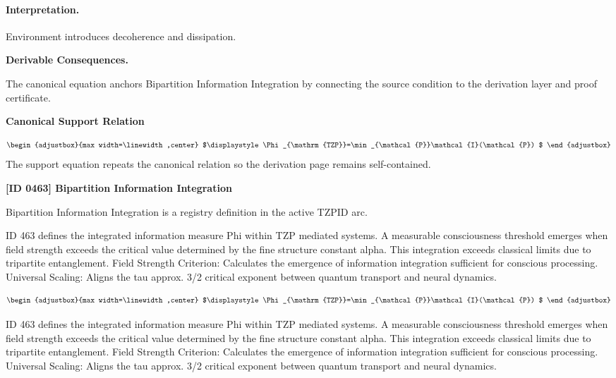 \paragraph{Interpretation.}
Environment introduces decoherence and dissipation.

\par\vspace{0.35em}
\noindent\textbf{Derivable Consequences.}\quad
\begingroup
\footnotesize
\raggedright
The canonical equation anchors Bipartition Information Integration by connecting the source condition to the derivation layer and proof certificate.
\par\endgroup

\noindent\textbf{Canonical Support Relation}\par
\[
\begin{adjustbox}{max width=\linewidth,center}
$\displaystyle
\Phi_{\mathrm{TZP}}=\min_{\mathcal{P}}\mathcal{I}(\mathcal{P})
$
\end{adjustbox}
\]
\noindent The support equation repeats the canonical relation so the derivation page remains self-contained.\par

\clearpage
\noindent\textbf{[ID 0463] Bipartition Information Integration}\par
\vspace{0.35em}
\begingroup\small
{}
Bipartition Information Integration is a registry definition in the active TZPID arc.

ID 463 defines the integrated information measure Phi within TZP mediated systems. A measurable consciousness threshold emerges when field strength exceeds the critical value determined by the fine structure constant alpha. This integration exceeds classical limits due to tripartite entanglement. Field Strength Criterion: Calculates the emergence of information integration sufficient for conscious processing. Universal Scaling: Aligns the tau approx. 3/2 critical exponent between quantum transport and neural dynamics.

\[
\begin{adjustbox}{max width=\linewidth,center}
$\displaystyle
\Phi_{\mathrm{TZP}}=\min_{\mathcal{P}}\mathcal{I}(\mathcal{P})
$
\end{adjustbox}
\]

ID 463 defines the integrated information measure Phi within TZP mediated systems. A measurable consciousness threshold emerges when field strength exceeds the critical value determined by the fine structure constant alpha. This integration exceeds classical limits due to tripartite entanglement. Field Strength Criterion: Calculates the emergence of information integration sufficient for conscious processing. Universal Scaling: Aligns the tau approx. 3/2 critical exponent between quantum transport and neural dynamics.

